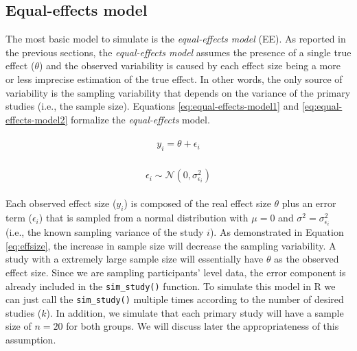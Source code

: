 \documentclass[
  man,floatsintext]{apa6}
\begin{document}
\normalsize

\hypertarget{equal-effects-model}{%
\subsection{Equal-effects model}\label{equal-effects-model}}

The most basic model to simulate is the \emph{equal-effects model} (EE). As reported in the previous sections, the \emph{equal-effects model} assumes the presence of a single true effect (\(\theta\)) and the observed variability is caused by each effect size being a more or less imprecise estimation of the true effect. In other words, the only source of variability is the sampling variability that depends on the variance of the primary studies (i.e., the sample size). Equations \eqref{eq:equal-effects-model1} and \eqref{eq:equal-effects-model2} formalize the \emph{equal-effects} model.

\begin{align}
\begin{gathered}
y_i = \theta + \epsilon_i
\label{eq:equal-effects-model1}
\end{gathered}
\end{align}

\begin{align}
\begin{gathered}
\epsilon_i \sim \mathcal{N}(0,\sigma_{\epsilon_i}^{2})
\label{eq:equal-effects-model2}
\end{gathered}
\end{align}

Each observed effect size (\(y_{i}\)) is composed of the real effect size \(\theta\) plus an error term (\(\epsilon_{i}\)) that is sampled from a normal distribution with \(\mu = 0\) and \(\sigma^{2} = \sigma_{\epsilon_i}^{2}\) (i.e., the known sampling variance of the study \(i\)). As demonstrated in Equation \eqref{eq:effsize}, the increase in sample size will decrease the sampling variability. A study with a extremely large sample size will essentially have \(\theta\) as the observed effect size. Since we are sampling participants' level data, the error component is already included in the \texttt{sim\_study()} function. To simulate this model in R we can just call the \texttt{sim\_study()} multiple times according to the number of desired studies (\(k\)). In addition, we simulate that each primary study will have a sample size of \(n = 20\) for both groups. We will discuss later the appropriateness of this assumption.
\end{document}

